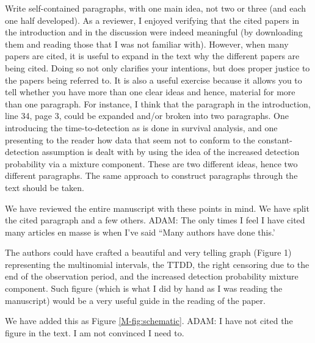 \documentclass[12pt]{article}
\renewenvironment{quote}  %
              {\list{}{\rightmargin\leftmargin}\normalfont%
               \item\relax}
              {\endlist}
\newcommand{\adam}[1]{{\color{blue} ADAM: #1}}
\begin{document}
Write self-contained paragraphs, with one main idea, not two or three (and each one half developed). As a reviewer, I enjoyed verifying that the cited papers in the introduction and in the discussion were indeed meaningful (by downloading them and reading those that I was not familiar with). However, when many papers are cited, it is useful to expand in the text why the different papers are being cited.  Doing so not only clarifies your intentions, but does proper justice to the papers being referred to. It is also a useful exercise because it allows you to tell whether you have more than one clear ideas and hence, material for more than one paragraph.  For instance, I think that the paragraph in the introduction, line 34, page 3, could be expanded and/or broken into two paragraphs.  One introducing the time-to-detection as is done in survival analysis, and one presenting to the reader how data that seem not to conform to the constant-detection assumption is dealt with by
using the idea of the increased detection probability via a mixture component. These are two different ideas, hence two different paragraphs. The same approach to construct paragraphs through the text should be taken.
\begin{quote}
We have reviewed the entire manuscript with these points in mind.
We have split the cited paragraph and a few others.
\adam{The only times I feel I have cited many articles en masse is when I've said ``Many authors have done this.'}
\end{quote}

The authors could have crafted a beautiful and very telling graph (Figure 1) representing the multinomial intervals, the TTDD, the right censoring due to the end of the observation period, and the increased detection probability mixture component. Such figure (which is what I did by hand as I was reading the manuscript) would be a very useful guide in the reading of the paper.
\begin{quote}
We have added this as Figure \ref{M-fig:schematic}.
\adam{I have not cited the figure in the text.  I am not convinced I need to.}
\end{quote}
\end{document}

